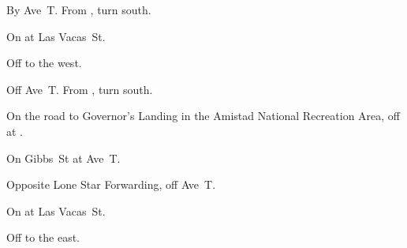 
\begin{LocationList}

By Ave~T. From , turn south.

\Location{\GarageHQ \Garage}
On  at Las Vacas~St.

Off   to the west.

Off Ave~T. From , turn south.

On the road to Governor's Landing
in the Amistad National Recreation Area,  %
off  at .

On  Gibbs~St at Ave~T.

\Location{\TruckService \Service}
Opposite Lone Star Forwarding, off Ave~T.

On  at Las Vacas~St.

Off   to the east.

\end{LocationList}
